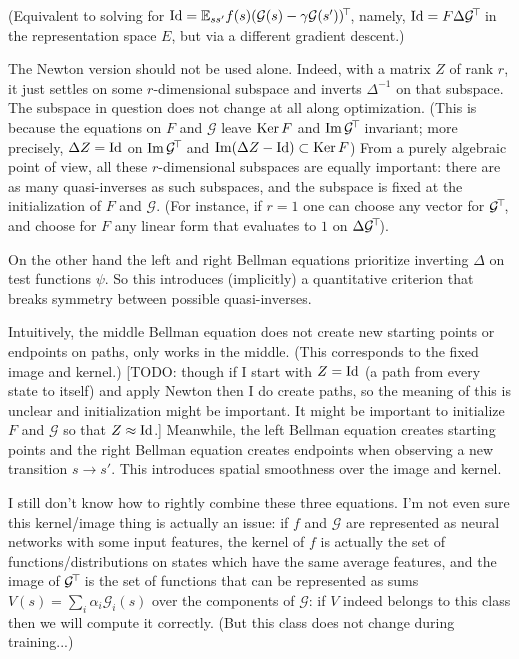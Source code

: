 \documentclass[11pt,a4paper]{article}
\newcommand{\green}{\mathcal{G}}
\begin{document}
(Equivalent to solving for $ \Id=\E_{ss'} f(s)\transp{(\green(s)-\gamma
\green(s'))}$, namely, $\Id=F\Delta\transp{\green}$ in the representation space $E$, but via a different gradient
descent.)

The Newton version should not be used alone. Indeed, with a matrix $Z$ of
rank $r$, it just settles on some $r$-dimensional subspace and inverts 
$\Delta^{-1}$ on that subspace. The subspace in question does not
change at all along optimization. (This is because the equations on $F$
and $\green$ leave $\operatorname{Ker} F$ and $\Img \transp{\green}$ invariant; more
precisely, $\Delta Z=\operatorname{Id}$ on $\Img \transp{\green}$ and $\operatorname{Im}(\Delta
Z-\operatorname{Id})\subset\operatorname{Ker} F$)
From a purely algebraic point of view,
all these $r$-dimensional subspaces are equally important: there are as
many quasi-inverses as such subspaces, and the subspace is fixed at the
initialization of $F$ and $\green$. (For instance, if $r=1$ one can
choose any vector for $\transp{\green}$, and choose for $F$ any linear
form that evaluates to $1$ on $\Delta \transp{\green}$).

On the other hand the left and right Bellman equations prioritize
inverting $\Delta$ on test functions $\psi$. So this introduces
(implicitly) a quantitative criterion that breaks symmetry between
possible quasi-inverses.

Intuitively, the middle Bellman equation does not create new starting
points or endpoints on paths, only works in the middle. (This corresponds
to the fixed image and kernel.) [TODO: though if I start with $Z=\operatorname{Id}$ (a
path from every state to itself) and apply Newton then I do create paths,
so the meaning of this is unclear and initialization might be important.
It might be important to initialize $F$ and $\green$ so that $Z\approx \operatorname{Id}$.] Meanwhile, the left Bellman equation
creates starting points and the right Bellman equation creates endpoints
when observing a new transition $s\to s'$. This introduces spatial
smoothness over the image and kernel.

I still don't know how to rightly combine these three equations. I'm not
even sure this kernel/image thing is actually an issue: if $f$ and
$\green$ are represented as neural networks with some input features,
the kernel of $f$ is actually the set of functions/distributions on
states which have the same average features, and the image of
$\transp{\green}$ is the set of functions that can be represented as sums
$V(s)=\sum_i \alpha_i\green_i(s)$ over the components of $\green$: if $V$
indeed belongs to this class then we will compute it correctly. (But this
class does not change during training...)
\end{document}
